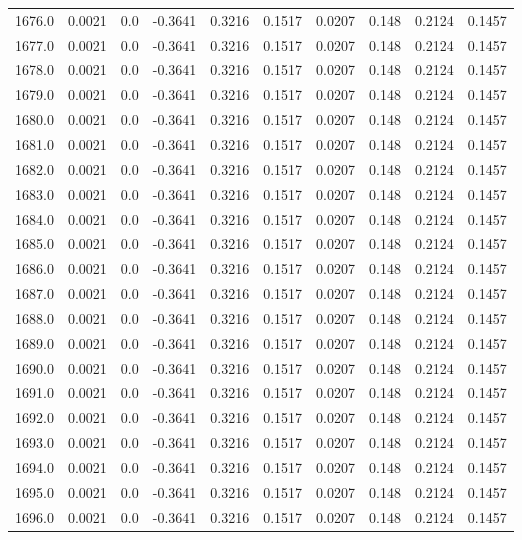\begin{longtable}{lrrrrrrrrr}
1676.0 & 0.0021 & 0.0 & -0.3641 & 0.3216 & 0.1517 & 0.0207 & 0.148 & 0.2124 & 0.1457 \\
1677.0 & 0.0021 & 0.0 & -0.3641 & 0.3216 & 0.1517 & 0.0207 & 0.148 & 0.2124 & 0.1457 \\
1678.0 & 0.0021 & 0.0 & -0.3641 & 0.3216 & 0.1517 & 0.0207 & 0.148 & 0.2124 & 0.1457 \\
1679.0 & 0.0021 & 0.0 & -0.3641 & 0.3216 & 0.1517 & 0.0207 & 0.148 & 0.2124 & 0.1457 \\
1680.0 & 0.0021 & 0.0 & -0.3641 & 0.3216 & 0.1517 & 0.0207 & 0.148 & 0.2124 & 0.1457 \\
1681.0 & 0.0021 & 0.0 & -0.3641 & 0.3216 & 0.1517 & 0.0207 & 0.148 & 0.2124 & 0.1457 \\
1682.0 & 0.0021 & 0.0 & -0.3641 & 0.3216 & 0.1517 & 0.0207 & 0.148 & 0.2124 & 0.1457 \\
1683.0 & 0.0021 & 0.0 & -0.3641 & 0.3216 & 0.1517 & 0.0207 & 0.148 & 0.2124 & 0.1457 \\
1684.0 & 0.0021 & 0.0 & -0.3641 & 0.3216 & 0.1517 & 0.0207 & 0.148 & 0.2124 & 0.1457 \\
1685.0 & 0.0021 & 0.0 & -0.3641 & 0.3216 & 0.1517 & 0.0207 & 0.148 & 0.2124 & 0.1457 \\
1686.0 & 0.0021 & 0.0 & -0.3641 & 0.3216 & 0.1517 & 0.0207 & 0.148 & 0.2124 & 0.1457 \\
1687.0 & 0.0021 & 0.0 & -0.3641 & 0.3216 & 0.1517 & 0.0207 & 0.148 & 0.2124 & 0.1457 \\
1688.0 & 0.0021 & 0.0 & -0.3641 & 0.3216 & 0.1517 & 0.0207 & 0.148 & 0.2124 & 0.1457 \\
1689.0 & 0.0021 & 0.0 & -0.3641 & 0.3216 & 0.1517 & 0.0207 & 0.148 & 0.2124 & 0.1457 \\
1690.0 & 0.0021 & 0.0 & -0.3641 & 0.3216 & 0.1517 & 0.0207 & 0.148 & 0.2124 & 0.1457 \\
1691.0 & 0.0021 & 0.0 & -0.3641 & 0.3216 & 0.1517 & 0.0207 & 0.148 & 0.2124 & 0.1457 \\
1692.0 & 0.0021 & 0.0 & -0.3641 & 0.3216 & 0.1517 & 0.0207 & 0.148 & 0.2124 & 0.1457 \\
1693.0 & 0.0021 & 0.0 & -0.3641 & 0.3216 & 0.1517 & 0.0207 & 0.148 & 0.2124 & 0.1457 \\
1694.0 & 0.0021 & 0.0 & -0.3641 & 0.3216 & 0.1517 & 0.0207 & 0.148 & 0.2124 & 0.1457 \\
1695.0 & 0.0021 & 0.0 & -0.3641 & 0.3216 & 0.1517 & 0.0207 & 0.148 & 0.2124 & 0.1457 \\
1696.0 & 0.0021 & 0.0 & -0.3641 & 0.3216 & 0.1517 & 0.0207 & 0.148 & 0.2124 & 0.1457 \\

\end{longtable}
